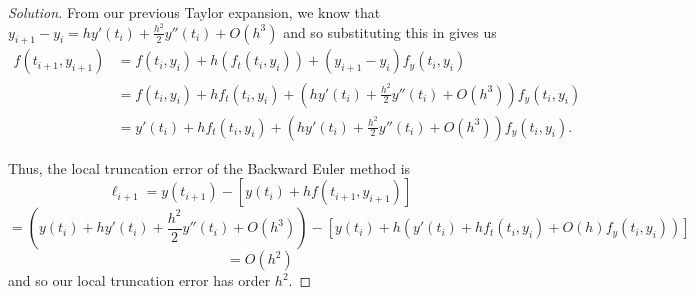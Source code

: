 \documentclass[11pt]{article}
\newenvironment{solution}
  {\renewcommand\qedsymbol{$\blacksquare$}\begin{proof}[Solution]}
  {\end{proof}}
\theoremstyle{definition}
\begin{document}
\begin{enumerate}
\begin{solution}
    From our previous Taylor expansion, we know that $y_{i+1} - y_{i} = hy'(t_i) + \frac{h^2}{2}y''(t_i) + O(h^3)$ and so substituting this in gives us
    \begin{align*} f(t_{i+1}, y_{i+1}) &= f(t_i, y_i) + h(f_t(t_i, y_i)) + (y_{i+1} - y_i)f_y(t_i, y_i) \\
    &= f(t_i, y_i) + hf_t(t_i, y_i) + \left(hy'(t_i) + \frac{h^2}{2}y''(t_i) + O(h^3)\right)f_y(t_i, y_i) \\
    &= y'(t_i) + hf_t(t_i, y_i) + \left(hy'(t_i) + \frac{h^2}{2}y''(t_i) + O(h^3)\right)f_y(t_i, y_i).
    \end{align*}

    Thus, the local truncation error of the Backward Euler method is
    \[ \ell_{i+1} = y(t_{i+1}) - [y(t_i) + hf(t_{i+1}, y_{i+1})] \]
    \[ = \left( y(t_i) + hy'(t_i) + \frac{h^2}{2}y''(t_i) + O(h^3) \right) - \left[ y(t_i) + h\left(y'(t_i) + hf_t(t_i, y_i) + O(h) f_y(t_i, y_i)\right) \right] \]
    \[ = O(h^2) \]
    and so our local truncation error has order $h^2$.
    \end{solution}







        

\end{enumerate}
\end{document}
